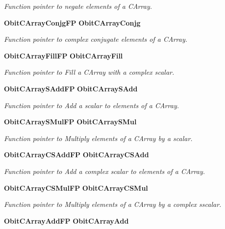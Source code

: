 \begin{CompactItemize}
\begin{CompactList}\small\item\em Function pointer to negate elements of a CArray. \item\end{CompactList}\item 
{\bf Obit\-CArray\-Conjg\-FP} {\bf Obit\-CArray\-Conjg}
\begin{CompactList}\small\item\em Function pointer to complex conjugate elements of a CArray. \item\end{CompactList}\item 
{\bf Obit\-CArray\-Fill\-FP} {\bf Obit\-CArray\-Fill}
\begin{CompactList}\small\item\em Function pointer to Fill a CArray with a complex scalar. \item\end{CompactList}\item 
{\bf Obit\-CArray\-SAdd\-FP} {\bf Obit\-CArray\-SAdd}
\begin{CompactList}\small\item\em Function pointer to Add a scalar to elements of a CArray. \item\end{CompactList}\item 
{\bf Obit\-CArray\-SMul\-FP} {\bf Obit\-CArray\-SMul}
\begin{CompactList}\small\item\em Function pointer to Multiply elements of a CArray by a scalar. \item\end{CompactList}\item 
{\bf Obit\-CArray\-CSAdd\-FP} {\bf Obit\-CArray\-CSAdd}
\begin{CompactList}\small\item\em Function pointer to Add a complex scalar to elements of a CArray. \item\end{CompactList}\item 
{\bf Obit\-CArray\-CSMul\-FP} {\bf Obit\-CArray\-CSMul}
\begin{CompactList}\small\item\em Function pointer to Multiply elements of a CArray by a complex sscalar. \item\end{CompactList}\item 
{\bf Obit\-CArray\-Add\-FP} {\bf Obit\-CArray\-Add}

\end{CompactItemize}
